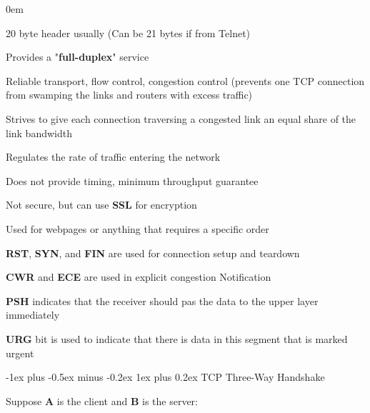 \documentclass[letterpaper,8pt]{extarticle}
\makeatletter
\renewcommand{\subsubsection}{\@startsection{subsubsection}{3}{0mm}%
  {-1ex plus -0.5ex minus -0.2ex}%
  {1ex plus 0.2ex}%
{\color{h3} \normalfont\fontsize{5.5}{5.5}\selectfont\bfseries\itshape}}
\let\olditemize\itemize \let\endolditemize\enditemize
\renewenvironment{itemize}{\olditemize \itemsep0em}{\endolditemize}
\makeatother
\begin{document}
\begin{multicols*}{5}
\begin{multicols}{2}
    \columnbreak

    \vspace*{\fill}
    \begin{itemize}
      \item 20 byte header usually (Can be 21 bytes if from Telnet)
      \item Provides a "\textbf{full-duplex}" service
      \item Reliable transport, flow control, congestion control (prevents one TCP connection from swamping the links and routers with excess traffic)
      \item Strives to give each connection traversing a congested link an equal share of the link bandwidth
      \item Regulates the rate of traffic entering the network
      \item Does not provide timing, minimum throughput guarantee
      \item Not secure, but can use \textbf{SSL} for encryption
      \item Used for webpages or anything that requires a specific order
      \item \textbf{RST}, \textbf{SYN}, and \textbf{FIN} are used for connection setup and teardown
      \item \textbf{CWR} and \textbf{ECE} are used in explicit congestion Notification
      \item \textbf{PSH} indicates that the receiver should pas the data to the upper layer immediately
      \item \textbf{URG} bit is used to indicate that there is data in this segment that is marked urgent
    \end{itemize}
    \vspace*{\fill}
  \end{multicols}

  \subsubsection{TCP Three-Way Handshake}

  Suppose \textbf{A} is the client and \textbf{B} is the server:


\end{multicols*}
\end{document}
